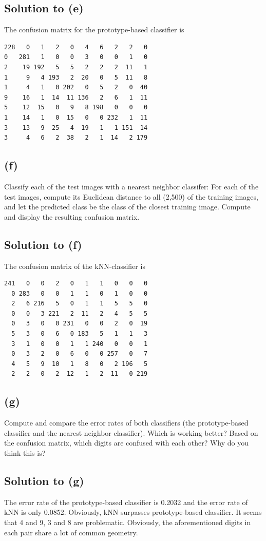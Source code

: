 \documentclass[10pt]{article}
\begin{document}
\subsection*{Solution to (e)}
The confusion matrix for the prototype-based classifier is
\begin{verbatim}
228   0   1   2   0   4   6   2   2   0
0   281   1   0   0   3   0   0   1   0
2    19 192   5   5   2   2   2  11   1
1     9   4 193   2  20   0   5  11   8
1     4   1   0 202   0   5   2   0  40
9    16   1  14  11 136   2   6   1  11
5    12  15   0   9   8 198   0   0   0
1    14   1   0  15   0   0 232   1  11
3    13   9  25   4  19   1   1 151  14
3     4   6   2  38   2   1  14   2 179
\end{verbatim}

\subsection*{(f)}
\color{blue}
Classify each of the test images with a nearest neighbor classifer: For each of the test images, compute its Euclidean distance to all (2,500) of the training images, and let the predicted class be the class of the closest training image. Compute and display the resulting confusion matrix.
\color{black}

\subsection*{Solution to (f)}
The confusion matrix of the kNN-classifier is
\begin{verbatim}
241   0   0   2   0   1   1   0   0   0
  0 283   0   0   1   1   0   1   0   0
  2   6 216   5   0   1   1   5   5   0
  0   0   3 221   2  11   2   4   5   5
  0   3   0   0 231   0   0   2   0  19
  5   3   0   6   0 183   5   1   1   3
  3   1   0   0   1   1 240   0   0   1
  0   3   2   0   6   0   0 257   0   7
  4   5   9  10   1   8   0   2 196   5
  2   2   0   2  12   1   2  11   0 219
\end{verbatim}

\subsection*{(g)}
\color{blue}
Compute and compare the error rates of both classifiers (the prototype-based classifier and the nearest neighbor classifier). Which is working better?  Based on the confusion matrix, which digits are confused with each other? Why do you think this is?
\color{black}

\subsection*{Solution to (g)}
The error rate of the prototype-based classifier is 0.2032 and the error rate of kNN is only 0.0852. Obviously, kNN surpasses prototype-based classifier. It seems that 4 and 9, 3 and 8 are problematic. Obviously, the aforementioned digits in each pair share a lot of common geometry.
\end{document}

